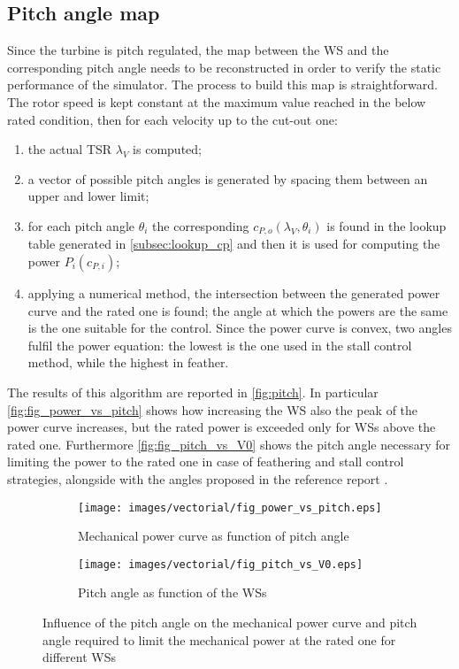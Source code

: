 \subsection{Pitch angle map}\label{subsec:pitch_map}
Since the turbine is pitch regulated, the map between the \acrshort{WS} and the corresponding pitch angle needs to be reconstructed in order to verify the static performance of the simulator. The process to build this map is straightforward. The rotor speed is kept constant at the maximum value reached in the below rated condition, then for each velocity up to the cut-out one:
\begin{enumerate}
    \item  the actual \acrshort{TSR} $\lambda_V$ is computed;
    \item a vector of possible pitch angles is generated by spacing them between an upper and lower limit;
    \item for each pitch angle $\theta_i$ the corresponding $c_{P,o}(\lambda_V, \theta_i)$ is found in the lookup table generated in \autoref{subsec:lookup_cp} and then it is used for computing the power $P_i(c_{P,i})$;
    \item applying a numerical method, the intersection between the generated power curve and the rated one is found; the angle at which the powers are the same is the one suitable for the control. Since the power curve is convex, two angles fulfil the power equation: the lowest is the one used in the stall control method, while the highest in feather.
\end{enumerate}
The results of this algorithm are reported in \autoref{fig:pitch}. In particular \autoref{fig:fig_power_vs_pitch} shows how increasing the \acrshort{WS} also the peak of the power curve increases, but the rated power is exceeded only for \acrshort{WSs} above the rated one. Furthermore \autoref{fig:fig_pitch_vs_V0} shows the pitch angle necessary for limiting the power to the rated one in case of feathering and stall control strategies, alongside with the angles proposed in the reference report \cite{DTU_Wind_Energy_Report-I-0092}. 
\begin{figure}[htb]
    \centering
    \begin{subfigure}{0.49\textwidth}
    \centering
    \texttt{[image: images/vectorial/fig\_power\_vs\_pitch.eps]}
    \caption{Mechanical power curve as function of pitch angle}
    \label{fig:fig_power_vs_pitch}
    \end{subfigure}
    \begin{subfigure}{0.49\textwidth}
    \texttt{[image: images/vectorial/fig\_pitch\_vs\_V0.eps]}
    \caption{Pitch angle as function of the \acrshort{WSs}}
    \label{fig:fig_pitch_vs_V0}
    \end{subfigure}
    \caption{Influence of the pitch angle on the mechanical power curve and pitch angle required to limit the mechanical power at the rated one for different \acrshort{WSs}}
    \label{fig:pitch}
\end{figure}

